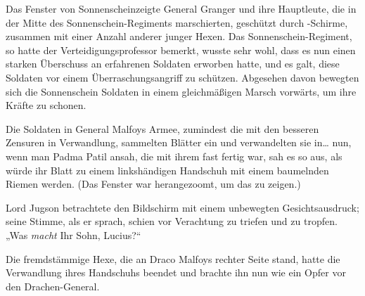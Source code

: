 Das Fenster von Sonnenscheinzeigte General Granger und ihre Hauptleute, die in der Mitte des Sonnenschein-Regiments marschierten, geschützt durch -Schirme, zusammen mit einer Anzahl anderer junger Hexen. Das Sonnenschein-Regiment, so hatte der Verteidigungsprofessor bemerkt, wusste sehr wohl, dass es nun einen starken Überschuss an erfahrenen Soldaten erworben hatte, und es galt, diese Soldaten vor einem Überraschungsangriff zu schützen. Abgesehen davon bewegten sich die Sonnenschein Soldaten in einem gleichmäßigen Marsch vorwärts, um ihre Kräfte zu schonen.

Die Soldaten in General Malfoys Armee, zumindest die mit den besseren Zensuren in Verwandlung, sammelten Blätter ein und verwandelten sie in… nun, wenn man Padma Patil ansah, die mit ihrem fast fertig war, sah es so aus, als würde ihr Blatt zu einem linkshändigen Handschuh mit einem baumelnden Riemen werden. (Das Fenster war herangezoomt, um das zu zeigen.)

Lord Jugson betrachtete den Bildschirm mit einem unbewegten Gesichtsausdruck; seine Stimme, als er sprach, schien vor Verachtung zu triefen und zu tropfen. „Was \emph{macht} Ihr Sohn, Lucius?“

Die fremdstämmige Hexe, die an Draco Malfoys rechter Seite stand, hatte die Verwandlung ihres Handschuhs beendet und brachte ihn nun wie ein Opfer vor den Drachen-General.

